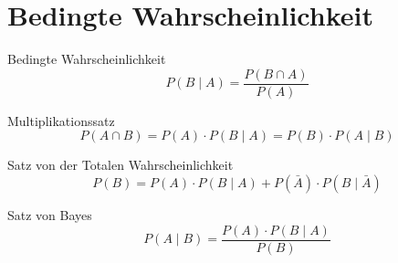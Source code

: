 \section{Bedingte Wahrscheinlichkeit}
\begin{definition}{Bedingte Wahrscheinlichkeit}
$$
P(B \mid A)=\frac{P(B \cap A)}{P(A)}
$$
\end{definition}

\begin{theorem}{Multiplikationssatz}
$$
P(A \cap B)=P(A) \cdot P(B \mid A)=P(B) \cdot P(A \mid B)
$$
\end{theorem}

\begin{theorem}{Satz von der Totalen Wahrscheinlichkeit}
$$
P(B)=P(A) \cdot P(B \mid A)+P(\bar{A}) \cdot P(B \mid \bar{A})
$$
\end{theorem}

\begin{theorem}{Satz von Bayes}
$$
P(A \mid B)=\frac{P(A) \cdot P(B \mid A)}{P(B)}
$$
\end{theorem}
